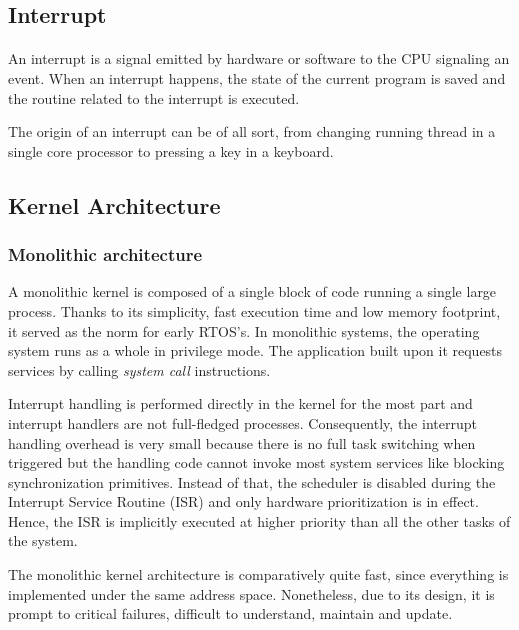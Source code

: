 \subsection{Interrupt}
\paragraph{}
An interrupt is a signal emitted by hardware or software to the CPU signaling an event.
When an interrupt happens, the state of the current program is saved 
    and the routine related to the interrupt is executed.

The origin of an interrupt can be of all sort, 
    from changing running thread in a single core processor to pressing a key in a keyboard.

\subsection{Kernel Architecture}

\subsubsection{Monolithic architecture}
A monolithic kernel is composed of a single block of code running a single large process.
Thanks to its simplicity, fast execution time and low memory footprint, it served as the norm for early RTOS's.
In monolithic systems, the operating system runs as a whole in privilege mode.
The application built upon it requests services by calling \textit{system call} instructions.

Interrupt handling is performed directly in the kernel for the most part and interrupt handlers are not full-fledged processes.
Consequently, the interrupt handling overhead is very small because there is no full task switching when triggered
    but the handling code cannot invoke most system services like blocking synchronization primitives.
Instead of that, the scheduler is disabled during the Interrupt Service Routine (ISR) and only hardware prioritization is in effect.
Hence, the ISR is implicitly executed at higher priority than all the other tasks of the system.

The monolithic kernel architecture is comparatively quite fast, since ev\-ery\-thing is implemented under the same address space.
Nonetheless, due to its design, it is prompt to critical failures, difficult to understand, maintain and update.

